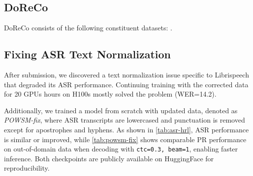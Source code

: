 \subsection{DoReCo \citep{paschen2020doreco}}
\label{sec:appendix-doreco}

DoReCo consists of the following constituent datasets: \citep{
doreco-anal1239,
doreco-apah1238,
doreco-arap1274,
doreco-bain1259,
doreco-beja1238,
doreco-bora1263,
doreco-cabe1245,
doreco-cash1254,
doreco-dolg1241,
doreco-even1259,
doreco-goem1240,
doreco-goro1270,
doreco-hoch1243,
doreco-jeha1242,
doreco-jeju1234,
doreco-kaka1265,
doreco-kama1351,
doreco-kark1256,
doreco-komn1238,
doreco-ligh1234,
doreco-lowe1385,
doreco-movi1243,
doreco-ngal1292,
doreco-nisv1234,
doreco-nngg1234,
doreco-nort2641,
doreco-nort2875,
doreco-orko1234,
doreco-pnar1238,
doreco-port1286,
doreco-resi1247,
doreco-ruul1235,
doreco-sadu1234,
doreco-sanz1248,
doreco-savo1255,
doreco-sout2856,
doreco-sout3282,
doreco-stan1290,
doreco-sumi1235,
doreco-svan1243,
doreco-taba1259,
doreco-teop1238,
doreco-texi1237,
doreco-trin1278,
doreco-tsim1256,
doreco-urum1249,
doreco-vera1241,
doreco-warl1254,
doreco-yong1270,
doreco-yuca1254,
doreco-yura1255}.


\subsection{Fixing ASR Text Normalization}
\label{sec:appendix-textissue}
After submission, we discovered a text normalization issue specific to Librispeech that degraded its ASR performance. 
Continuing training with the corrected data for 20 GPUs hours on H100s mostly solved the problem (WER=14.2). 

Additionally, we trained a model from scratch with updated data, denoted as \textit{POWSM-fix}, where ASR transcripts are lowercased and punctuation is removed except for apostrophes and hyphens.
As shown in \autoref{tab:asr-hrl}, ASR performance is similar or improved, while \autoref{tab:powsm-fix} shows comparable PR performance on out-of-domain data when decoding with \texttt{ctc=0.3, beam=1}, enabling faster inference.
Both checkpoints are publicly available on HuggingFace for reproducibility.

\begin{table}[h]
\centering
\small
\setlength{\tabcolsep}{2pt} %
\renewcommand{\arraystretch}{1.2}
\caption{PFER ($\downarrow$) comparison on out-of-domain data.}
\label{tab:powsm-fix}
\end{table}
